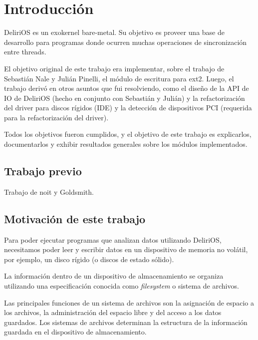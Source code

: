 
\chapter*{Introducción}
DeliriOS es un exokernel bare-metal. Su objetivo es proveer una base de desarrollo para programas donde ocurren muchas operaciones de sincronización entre threads.

El objetivo original de este trabajo era implementar, sobre el trabajo de Sebastián Nale y Julián Pinelli, el módulo de escritura para ext2.
Luego, el trabajo derivó en otros asuntos que fui resolviendo, como el diseño de la API de IO de DeliriOS (hecho en conjunto con Sebastián y Julián) y la refactorización del driver para discos rígidos (IDE) y la detección de dispositivos PCI (requerida para la refactorización del driver).

Todos los objetivos fueron cumplidos, y el objetivo de este trabajo es explicarlos, documentarlos y exhibir resultados generales sobre los módulos implementados.
\newpage

\section*{Trabajo previo}
\begin{puntos}
  \item Trabajo de noit y Goldsmith.
\end{puntos}



\section*{Motivación de este trabajo}

Para poder ejecutar programas que analizan datos utilizando DeliriOS, necesitamos poder leer y escribir datos en un dispositivo de memoria no volátil, por ejemplo, un disco rígido (o discos de estado sólido).

La información dentro de un dispositivo de almacenamiento se organiza utilizando una especificación conocida como \emph{filesystem} o sistema de archivos. 

Las principales funciones de un sistema de archivos son la asignación de espacio a los archivos, la administración del espacio libre y del acceso a los datos guardados.
Los sistemas de archivos determinan la estructura de la información guardada en el dispositivo de almacenamiento.

